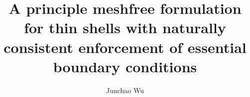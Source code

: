 \documentclass{elsarticle}
\begin{document}
\begin{frontmatter}
    \title{A principle meshfree formulation for thin shells with naturally consistent enforcement of essential boundary conditions}
    \author[1]{Junchao Wu}
\end{frontmatter}






\appendix



\end{document}
